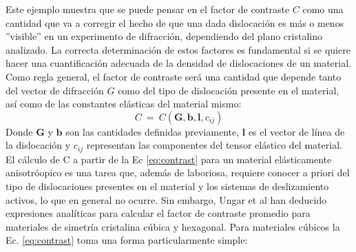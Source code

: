 Este ejemplo muestra que se puede pensar en el factor de contraste $C$ como una cantidad que va a corregir el hecho de que una dada dislocación es más o menos ''visible'' en un experimento de difracción, dependiendo del plano cristalino analizado.
La correcta determinación de estos factores es fundamental si se quiere hacer una cuantificación adecuada de la densidad de dislocaciones de un material.
Como regla general, el factor de contraste será una cantidad que depende tanto del vector de difracción $G$ como del tipo de dislocación presente en el material, así como de las constantes elásticas del material mismo:
\begin{equation}
  C \ = \ C(\mathbf{G},\mathbf{b},\mathbf{l},c_{ij})
  \label{eq:contrast}
\end{equation}
\noindent
Donde $\mathbf{G}$ y $\mathbf{b}$ son las cantidades definidas previamente, $\mathbf{l}$ es el vector de línea de la dislocación y $c_{ij}$ representan las componentes del tensor elástico del material.
El cálculo de C a partir de la Ec \ref{eq:contrast} para un material elásticamente anisotróopico es una tarea que, además de laboriosa, requiere conocer a priori del tipo de dislocaciones presentes en el material y los sistemas de deslizamiento activos, lo que en general no ocurre.
Sin embargo, Ungar et al\cite{Dragomir1999,Dragomir2002} han deducido expresiones analíticas para calcular el factor de contraste promedio para materiales de simetría cristalina cúbica y hexagonal. Para materiales cúbicos la Ec. \ref{eq:contrast} toma una forma particularmente simple:

